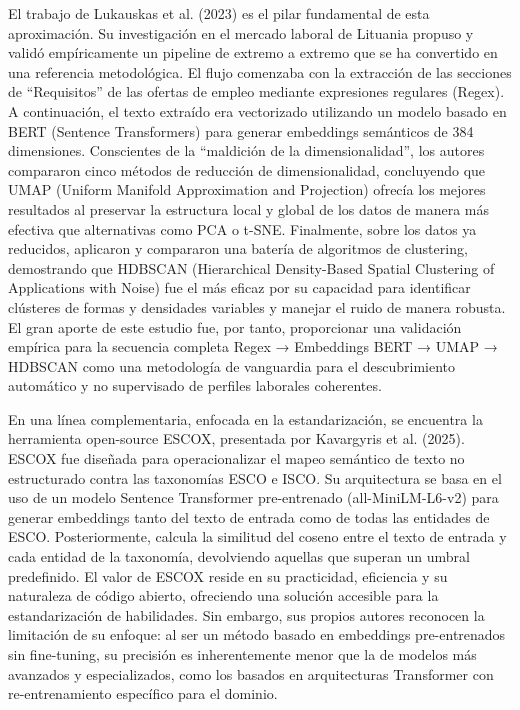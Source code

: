 El trabajo de Lukauskas et al. (2023) es el pilar fundamental de esta aproximación. Su investigación en el mercado laboral de Lituania propuso y validó empíricamente un pipeline de extremo a extremo que se ha convertido en una referencia metodológica. El flujo comenzaba con la extracción de las secciones de ``Requisitos'' de las ofertas de empleo mediante expresiones regulares (Regex). A continuación, el texto extraído era vectorizado utilizando un modelo basado en BERT (Sentence Transformers) para generar embeddings semánticos de 384 dimensiones. Conscientes de la ``maldición de la dimensionalidad'', los autores compararon cinco métodos de reducción de dimensionalidad, concluyendo que UMAP (Uniform Manifold Approximation and Projection) ofrecía los mejores resultados al preservar la estructura local y global de los datos de manera más efectiva que alternativas como PCA o t-SNE. Finalmente, sobre los datos ya reducidos, aplicaron y compararon una batería de algoritmos de clustering, demostrando que HDBSCAN (Hierarchical Density-Based Spatial Clustering of Applications with Noise) fue el más eficaz por su capacidad para identificar clústeres de formas y densidades variables y manejar el ruido de manera robusta. El gran aporte de este estudio fue, por tanto, proporcionar una validación empírica para la secuencia completa Regex → Embeddings BERT → UMAP → HDBSCAN como una metodología de vanguardia para el descubrimiento automático y no supervisado de perfiles laborales coherentes.

En una línea complementaria, enfocada en la estandarización, se encuentra la herramienta open-source ESCOX, presentada por Kavargyris et al. (2025). ESCOX fue diseñada para operacionalizar el mapeo semántico de texto no estructurado contra las taxonomías ESCO e ISCO. Su arquitectura se basa en el uso de un modelo Sentence Transformer pre-entrenado (all-MiniLM-L6-v2) para generar embeddings tanto del texto de entrada como de todas las entidades de ESCO. Posteriormente, calcula la similitud del coseno entre el texto de entrada y cada entidad de la taxonomía, devolviendo aquellas que superan un umbral predefinido. El valor de ESCOX reside en su practicidad, eficiencia y su naturaleza de código abierto, ofreciendo una solución accesible para la estandarización de habilidades. Sin embargo, sus propios autores reconocen la limitación de su enfoque: al ser un método basado en embeddings pre-entrenados sin fine-tuning, su precisión es inherentemente menor que la de modelos más avanzados y especializados, como los basados en arquitecturas Transformer con re-entrenamiento específico para el dominio.

